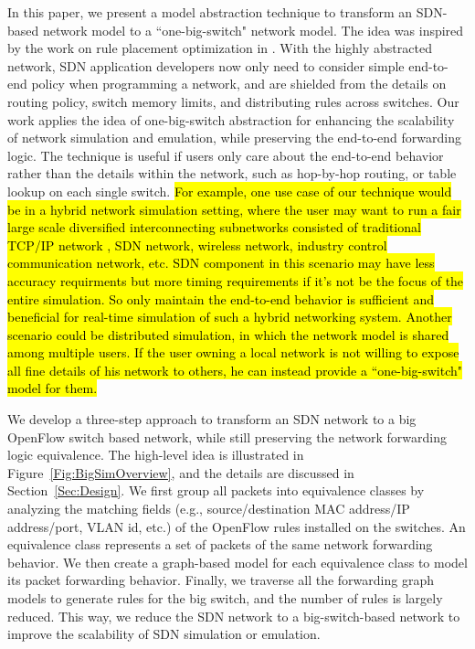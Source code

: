 In this paper, we present a model abstraction technique to transform an SDN-based network model to a ``one-big-switch" network model.
The idea was inspired by the work on rule placement optimization in \cite{OneBigSwitchAbstraction}.
With the highly abstracted network, SDN application developers now only need to consider
simple end-to-end policy when programming a network,
and are shielded from the details on routing policy, switch memory limits,
and distributing rules across switches.
Our work applies the idea of one-big-switch abstraction for enhancing the scalability
of network simulation and emulation, while preserving the end-to-end forwarding logic.
The technique is useful if users only care about the end-to-end behavior rather than
the details within the network, such as hop-by-hop routing, or table lookup on each single switch.
\hl{
For example, one use case of our technique would be in a hybrid network simulation setting, where the user may want to run a fair large scale diversified
interconnecting subnetworks consisted of traditional TCP/IP network , SDN network, wireless network,
industry control communication network, etc.
SDN component in this scenario may have less accuracy requirments but more timing requirements if it's not be the focus of the entire simulation. So only maintain the end-to-end behavior is sufficient and beneficial for real-time simulation of such a hybrid networking system. Another scenario could be distributed simulation, in which the network model is shared among multiple users. If the user owning a local network is not willing to expose all fine details of his network to others, he can instead provide a ``one-big-switch" model for them.
}

We develop a three-step approach to transform an SDN network to a big OpenFlow switch based network,
while still preserving the network forwarding logic equivalence.
The high-level idea is illustrated in Figure~\ref{Fig:BigSimOverview},
and the details are discussed in Section~\ref{Sec:Design}.
We first group all packets into equivalence classes by analyzing the matching fields
(e.g., source/destination MAC address/IP address/port, VLAN id, etc.)
of the OpenFlow rules installed on the switches.
An equivalence class represents a set of packets of the same network forwarding behavior.
We then create a graph-based model for each equivalence class to model its packet forwarding behavior.
Finally, we traverse all the forwarding graph models to generate rules for the big switch,
and the number of rules is largely reduced.
This way, we reduce the SDN network to a big-switch-based network to
improve the scalability of SDN simulation or emulation.


